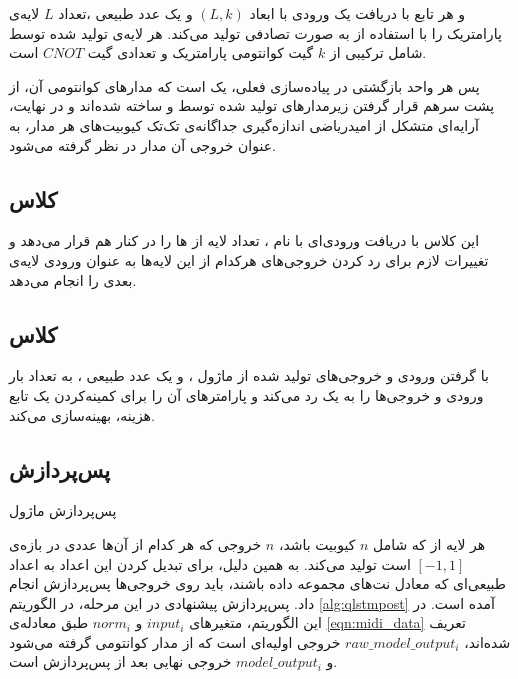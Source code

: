 و هر تابع 
با دریافت یک ورودی با ابعاد
$(L, k)$
و یک عدد طبیعی
،تعداد
$L$
لایه‌ی پارامتریک را با استفاده از
به صورت تصادفی تولید می‌کند.
هر لایه‌ی تولید شده توسط
شامل ترکیبی از 
$k$
گیت کوانتومی پارامتریک و تعدادی گیت 
$CNOT$
است.

پس هر واحد بازگشتی در پیاده‌سازی فعلی، یک
است که مدارهای کوانتومی آن، از پشت سرهم قرار گرفتن زیرمدارهای تولید شده توسط
و
ساخته شده‌اند و در نهایت، آرایه‌ای متشکل از امیدریاضی اندازه‌گیری جداگانه‌ی تک‌تک کیوبیت‌های هر مدار، به عنوان خروجی آن مدار در نظر گرفته می‌شود.

\subsection{
کلاس
}
این کلاس با دریافت ورودی‌ای با نام
،
تعداد
لایه از 
ها را در کنار هم قرار می‌دهد و تغییرات لازم برای رد کردن خروجی‌های هرکدام از این لایه‌ها به عنوان ورودی لایه‌ی بعدی را انجام می‌دهد.

\subsection{
کلاس
}
با گرفتن ورودی و خروجی‌های تولید شده از ماژول
،
و یک عدد طبیعی
،
به تعداد
بار
ورودی و خروجی‌ها را به یک 
رد می‌کند و پارامترهای آن را برای کمینه‌کردن یک تابع هزینه، بهینه‌سازی می‌کند.

\subsection{پس‌پردازش} \label{sec:qlstm_post}
\begin{algorithm}[t]
\caption{پس‌پردازش ماژول }  \label{alg:qlstmpost}
\end{algorithm}
هر لایه از
که شامل
$n$
کیوبیت باشد، 
$n$
خروجی که هر کدام از آن‌ها عددی در بازه‌ی
$[-1, 1]$
است تولید می‌کند. به همین دلیل، برای تبدیل کردن این اعداد به اعداد طبیعی‌ای که معادل نت‌های مجموعه داده باشند، باید روی خروجی‌ها پس‌پردازش انجام داد.
پس‌پردازش پیشنهادی در این مرحله، در الگوریتم
\ref{alg:qlstmpost}
آمده است. در این الگوریتم، متغیرهای
$input_i$
و
$norm_i$
طبق معادله‌ی
\ref{eqn:midi_data}
تعریف شده‌اند،
$raw\_model\_output_i$
خروجی اولیه‌ای است که از مدار کوانتومی گرفته می‌شود و
$model\_output_i$
خروجی نهایی بعد از پس‌پردازش است.



